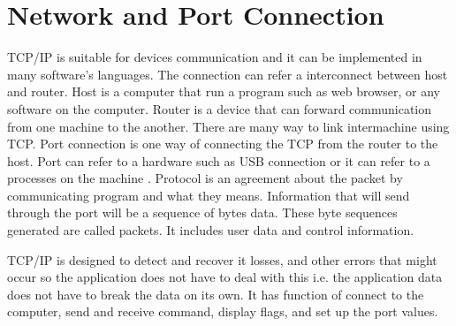 \section{Network and Port Connection}

TCP/IP is suitable for devices communication and it can be implemented in many software's languages.
The connection can refer a interconnect between host and router.
Host is a computer that run a program such as web browser, or any software on the computer\cite{davidB}.
Router is a device that can forward communication from one machine to the another.
There are many way to link intermachine using TCP.
Port connection is one way of connecting the TCP from the router to the host.
Port can refer to a hardware such as USB connection or it can refer to a processes on the machine \cite{normanM}.
Protocol is an agreement about the packet by communicating program and what they means.
Information that will send through the port will be a sequence of bytes data. 
These byte sequences generated are called packets\cite{davidB}.
It includes user data and control information.

TCP/IP is designed to detect and recover it losses, and other errors that might occur so the application does not have to deal with this \cite{davidB} i.e. the application data does not have to break the data on its own. It has function of connect to the computer, send and receive command, display flags, and set up the port values.


 